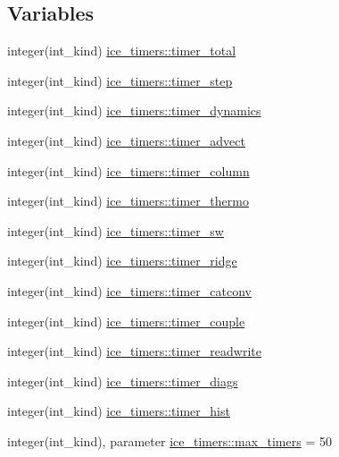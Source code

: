 \subsection*{Variables}
\begin{DoxyCompactItemize}
\item 
integer(int\_\-kind) \hyperlink{namespaceice__timers_af4544096584c21d56bb41d500d4a1e7b}{ice\_\-timers::timer\_\-total}
\item 
integer(int\_\-kind) \hyperlink{namespaceice__timers_a2f62f4afeed2dc2700a9bf7c15e6d746}{ice\_\-timers::timer\_\-step}
\item 
integer(int\_\-kind) \hyperlink{namespaceice__timers_ada6ea9e52bcd16e1d5ea869c9ef86e30}{ice\_\-timers::timer\_\-dynamics}
\item 
integer(int\_\-kind) \hyperlink{namespaceice__timers_a661df1c3c16f3dbba252198a2de779c6}{ice\_\-timers::timer\_\-advect}
\item 
integer(int\_\-kind) \hyperlink{namespaceice__timers_ab9384dde0a037de0babca404c47d3084}{ice\_\-timers::timer\_\-column}
\item 
integer(int\_\-kind) \hyperlink{namespaceice__timers_af9a7c2e62659a0c8babe31eeb749aabd}{ice\_\-timers::timer\_\-thermo}
\item 
integer(int\_\-kind) \hyperlink{namespaceice__timers_a6fd87221d7d148cbbd9b6c885a235034}{ice\_\-timers::timer\_\-sw}
\item 
integer(int\_\-kind) \hyperlink{namespaceice__timers_a9005547a6ce9d2b619697fc3c7167df7}{ice\_\-timers::timer\_\-ridge}
\item 
integer(int\_\-kind) \hyperlink{namespaceice__timers_ab82172beab2bd8755db6ebcfe7ae5f35}{ice\_\-timers::timer\_\-catconv}
\item 
integer(int\_\-kind) \hyperlink{namespaceice__timers_a08bc2ebb9f8789a162d1f1ee3df678a2}{ice\_\-timers::timer\_\-couple}
\item 
integer(int\_\-kind) \hyperlink{namespaceice__timers_af250a2fa78a031dcb6f923aa2afb2813}{ice\_\-timers::timer\_\-readwrite}
\item 
integer(int\_\-kind) \hyperlink{namespaceice__timers_a6b3fa397674377c5596ab9a0a4e1beb2}{ice\_\-timers::timer\_\-diags}
\item 
integer(int\_\-kind) \hyperlink{namespaceice__timers_a97b81f9ad9a98de0710a2f1859113352}{ice\_\-timers::timer\_\-hist}
\item 
integer(int\_\-kind), parameter \hyperlink{namespaceice__timers_aa410a1135c41a4e3216716ae83adfd64}{ice\_\-timers::max\_\-timers} = 50
\item 

\end{DoxyCompactItemize}
